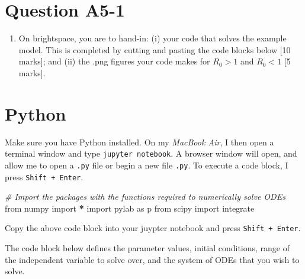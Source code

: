 \documentclass[]{book}
\newenvironment{Shaded}{\begin{snugshade}}{\end{snugshade}}
\newcommand{\ImportTok}[1]{{#1}}
\newcommand{\CommentTok}[1]{\textcolor[rgb]{0.56,0.35,0.01}{\textit{{#1}}}}
\newcommand{\OperatorTok}[1]{\textcolor[rgb]{0.81,0.36,0.00}{\textbf{{#1}}}}
\newcommand{\NormalTok}[1]{{#1}}
\providecommand{\tightlist}{%
  \setlength{\itemsep}{0pt}\setlength{\parskip}{0pt}}
\begin{document}
\section{Question A5-1}\label{question-a5-1}

\begin{enumerate}
\def\labelenumi{\arabic{enumi}.}
\tightlist
\item
  On brightspace, you are to hand-in: (i) your code that solves the
  example model. This is completed by cutting and pasting the code
  blocks below {[}10 marks{]}; and (ii) the .png figures your code makes
  for \(R_0 > 1\) and \(R_0 < 1\) {[}5 marks{]}.
\end{enumerate}

\section{Python}\label{python}

Make sure you have Python installed. On my \emph{MacBook Air}, I then
open a terminal window and type \texttt{jupyter\ notebook}. A browser
window will open, and allow me to open a \texttt{.py} file or begin a
new file \texttt{.py}. To execute a code block, I press
\texttt{Shift\ +\ Enter}.

\begin{Shaded}
\begin{Highlighting}[]
\CommentTok{# Import the packages with the functions required to numerically solve ODEs}
\ImportTok{from} \NormalTok{numpy }\ImportTok{import} \OperatorTok{*}
\ImportTok{import} \NormalTok{pylab }\ImportTok{as} \NormalTok{p}
\ImportTok{from} \NormalTok{scipy }\ImportTok{import} \NormalTok{integrate}
\end{Highlighting}
\end{Shaded}

Copy the above code block into your juypter notebook and press
\texttt{Shift\ +\ Enter}.

The code block below defines the parameter values, initial conditions,
range of the independent variable to solve over, and the system of ODEs
that you wish to solve.
\end{document}
